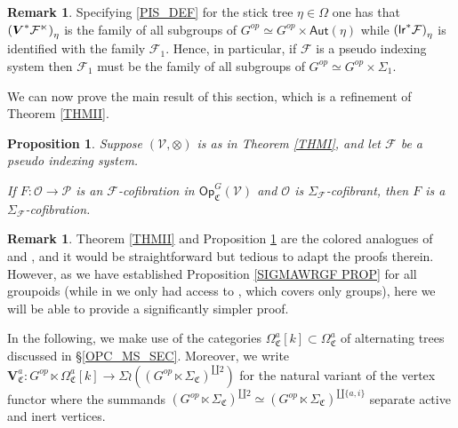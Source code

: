 \documentclass[a4paper,10pt
,draft
]{article}%
\numberwithin{equation}{section}
\numberwithin{figure}{section}
\newtheorem{proposition}[equation]{Proposition}%
\theoremstyle{definition} %
\newtheorem{remark}[equation]{Remark}%
\newcommand{\Op}{\mathsf{Op}}%
\newcommand{\F}{\ensuremath{\mathcal F}}
\newcommand{\V}{\ensuremath{\mathcal V}}
\renewcommand{\O}{\ensuremath{\mathcal O}}
\renewcommand{\P}{\ensuremath{\mathcal P}}
\newcommand{\1}{\ensuremath{\mathbbm 1}}%
\begin{document}
\begin{remark}\label{PSEUSTI REM}
	Specifying \eqref{PIS_DEF}
	for the stick tree $\eta \in \Omega$
	one has that 
$
\left(\boldsymbol{V}^{\**} \mathcal{F}^{\ltimes}\right)_{\eta}
$
	is the family of all subgroups of
	$G^{op} \simeq G^{op} \times \mathsf{Aut}(\eta)$
	while
$
\left(\mathsf{lr}^{\**} \mathcal{F}\right)_{\eta}
$
is identified with the family 
$\F_1$.
Hence, in particular, if $\F$ is a pseudo indexing system then
$\F_1$ must be the family of all subgroups of
$G^{op} \simeq G^{op} \times \Sigma_1$.
\end{remark}



We can now prove the main result of this section, which is a refinement of Theorem
\ref{THMII}.



	
	
\begin{proposition}\label{SIGMAG_COF PROP}
	Suppose $(\V, \otimes)$ is as in Theorem \ref{THMI},
	and let $\F$ be a pseudo indexing system.
      
	If $F \colon \O \to \P$ is an $\F$-cofibration in $\Op^G_{\mathfrak C}(\V)$ and $\O$ is $\Sigma_\F$-cofibrant,
	then $F$ is a $\Sigma_\F$-cofibration.
\end{proposition}

\begin{remark}\label{STRTED REM}
	Theorem \ref{THMII} and Proposition \ref{SIGMAG_COF PROP}
	are the colored analogues of 
	\cite[Lemma 6.59]{BP_geo} and \cite[Remark 6.64]{BP_geo},
	and it would be straightforward but tedious to adapt the proofs therein.
%	
	However, as we have established 
	Proposition \ref{SIGMAWRGF PROP} for all groupoids
	(while in \cite{BP_geo}
	we only had access to \cite[Prop. 6.24]{BP_geo},
	which covers only groups),
	here we will be able to provide a significantly simpler proof.
\end{remark}



In the following, we make use of the categories
$\Omega^{a}_{\mathfrak{C}}[k] 
\subset 
\Omega^{a}_{\mathfrak{C}}$
of alternating trees discussed in \S \ref{OPC_MS_SEC}.
Moreover, we write
$\boldsymbol{V}^a_{\mathfrak{C}}
\colon G^{op} \ltimes \Omega^{a}_{\mathfrak{C}}[k] 
\to 
\Sigma \wr 
\left((G^{op} \ltimes \Sigma_{\mathfrak{C}})^{\amalg 2}\right)$ 
for the natural variant of the vertex functor 
where the summands 
$(G^{op} \ltimes \Sigma_{\mathfrak{C}})^{\amalg 2} \simeq
(G^{op} \ltimes \Sigma_{\mathfrak{C}})^{\amalg \{a,i\}}$
separate active and inert vertices.
\end{document}
